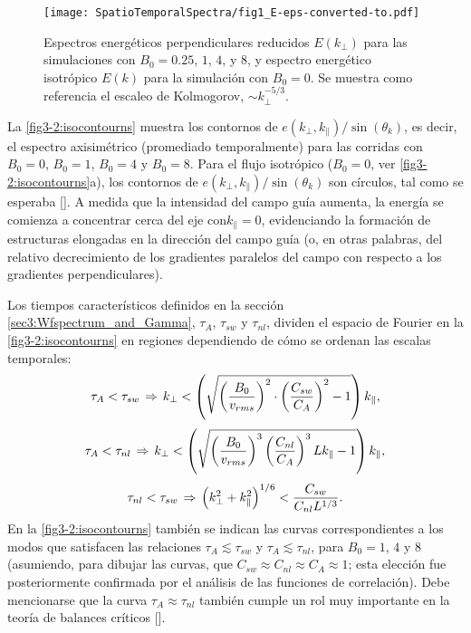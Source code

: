 \begin{figure}
  \centering
  \texttt{[image: SpatioTemporalSpectra/fig1\_E-eps-converted-to.pdf]}
  \caption{Espectros energéticos perpendiculares reducidos $E(k_\perp)$ para las
  simulaciones con $B_0=0.25$, $1$, $4$, y $8$, y espectro energético
  isotrópico $E(k)$ para la simulación con $B_0=0$. Se muestra como
  referencia el escaleo de Kolmogorov, $\sim k_\perp^{-5/3}$.}
  \label{fig3-1:E}
\end{figure}


La \cref{fig3-2:isocontourns} muestra los contornos de
$e(k_\perp,k_\parallel)/\sin(\theta_k)$, es decir, el espectro
axisimétrico (promediado temporalmente) para las corridas con $B_0=0$,
$B_0=1$, $B_0=4$ y $B_0=8$. Para el flujo isotrópico ($B_0=0$, ver
\cref{fig3-2:isocontourns}a), los contornos de
$e(k_\perp,k_\parallel)/\sin(\theta_k)$ son círculos, tal como se
esperaba [\cite{mininni_isotropization_2012}]. A medida que la
intensidad del campo guía aumenta, la energía se comienza a concentrar
cerca del eje con$k_\parallel=0$, evidenciando la formación de
estructuras elongadas en la dirección del campo guía (o, en otras
palabras, del relativo decrecimiento de los gradientes paralelos del
campo con respecto a los gradientes perpendiculares).

Los tiempos característicos definidos en la
sección \ref{sec3:Wfspectrum_and_Gamma}, $\tau_A$, $\tau_{sw}$ y
$\tau_{nl}$, dividen el espacio de Fourier en
la \cref{fig3-2:isocontourns} en regiones dependiendo de cómo se
ordenan las escalas temporales:
\begin{equation}\label{eq3:Asw} \tau_A < \tau_{sw} \hspace{0.05cm}
\Rightarrow \hspace{0.05cm} k_\perp <
\left(\sqrt{\left(\frac{B_0}{v_{rms}}\right)^2 \cdot
\left(\frac{C_{sw}}{C_A}\right)^2 - 1} \right) k_\parallel,
\end{equation}
\begin{equation}\label{eq3:Anl} \tau_A < \tau_{nl} \hspace{0.05cm}
\Rightarrow \hspace{0.05cm} k_\perp <
\left(\sqrt{\left(\frac{B_0}{v_{rms}}\right)^3
\left(\frac{C_{nl}}{C_A}\right)^3 Lk_\parallel - 1} \right) 
k_\parallel,
\end{equation}
\begin{equation}\label{eq3:nlsw} \tau_{nl} < \tau_{sw} \hspace{0.05cm}
\Rightarrow \hspace{0.05cm} \left( k_\perp^2 + k_\parallel^2
\right)^{1/6} < \frac{C_{sw}}{C_{nl}L^{1/3}}.
\end{equation}
En la \cref{fig3-2:isocontourns} también se indican las curvas
correspondientes a los modos que satisfacen las relaciones
$\tau_A\lesssim\tau_{sw}$ y $\tau_A\lesssim\tau_{nl}$, para $B_0=1$,
$4$ y $8$ (asumiendo, para dibujar las curvas, que $C_{sw} \approx
C_{nl} \approx C_A \approx 1$; esta elección fue posteriormente
confirmada por el análisis de las funciones de correlación). Debe
mencionarse que la curva $\tau_A\approx\tau_{nl}$ también cumple un
rol muy importante en la teoría de balances críticos
[\cite{sridhar_toward_1994}].

